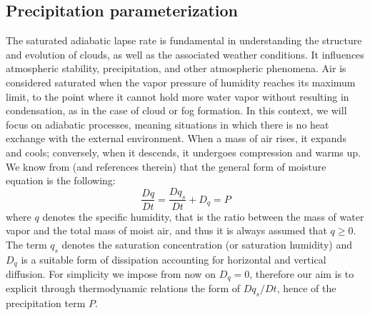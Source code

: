 \documentclass[11pt, a4paper, article,reqno,]{amsart}
\theoremstyle{remark}
\numberwithin{equation}{section}
\begin{document}
\subsection{Precipitation parameterization}\label{precipit}
The saturated adiabatic lapse rate is fundamental in understanding the structure and evolution of clouds, as well as the associated weather conditions. It influences atmospheric stability, precipitation, and other atmospheric phenomena. Air is considered saturated when the vapor pressure of humidity reaches its maximum limit, to the point where it cannot hold more water vapor without resulting in condensation, as in the case of cloud or fog formation. In this context, we will focus on adiabatic processes, meaning situations in which there is no heat exchange with the external environment. When a mass of air rises, it expands and cools; conversely, when it descends, it undergoes compression and warms up. We know from \cite{CZ} (and references therein) that the general form of moisture equation is the following:
\begin{equation}
    \frac{Dq}{Dt} = \frac{Dq_s}{Dt} + D_q=P
    \label{eq. for P}
\end{equation}
where \(q\) denotes the specific humidity, that is the ratio between the mass of water vapor and the total mass of moist air, and thus it is always assumed that \(q \geq 0\). The term $q_s$ denotes the saturation concentration (or saturation humidity) and $D_q$ is a suitable form of dissipation accounting for horizontal and vertical diffusion. 
For simplicity we impose from now on $D_q=0$, therefore our aim is to explicit through thermodynamic relations the form of $Dq_s/Dt$, hence of the precipitation term $P$. 
\end{document}
